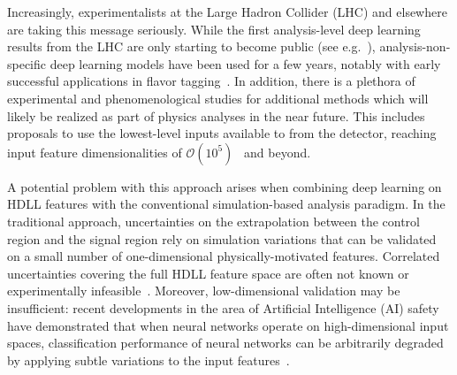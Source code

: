 \documentclass[reprint,nofootinbib,...]{revtex4-1}
\begin{document}

Increasingly, experimentalists at the Large Hadron Collider (LHC) and elsewhere are taking this message seriously.
While the first analysis-level deep learning results from the LHC are only starting to become public (see e.g.~\cite{Aad:2019yxi,ATLAS-CONF-2019-017,CMS-PAS-SUS-19-009}), analysis-non-specific deep learning models have been used for a few years, notably with early successful applications in flavor tagging~\cite{CMS-DP-2017-005,ATL-PHYS-PUB-2017-003}.
In addition, there is a plethora of experimental and phenomenological studies for additional methods which will likely be realized as part of physics analyses in the near future.
This includes proposals to use the lowest-level inputs available to from the detector, reaching input feature dimensionalities of $\mathcal{O}(10^5)$~\cite{Andrews:2018nwy,Andrews:2019faz} and beyond.



A potential problem with this approach arises when combining deep learning on HDLL features with the conventional simulation-based analysis paradigm.  In the traditional approach, uncertainties on the extrapolation between the control region and the signal region rely on simulation variations that can be validated on a small number of one-dimensional physically-motivated features.  Correlated uncertainties covering the full HDLL feature space are often not known or experimentally infeasible~\cite{Nachman:2019dol}.
Moreover, low-dimensional validation may be insufficient: recent developments in the area of Artificial Intelligence (AI) safety have demonstrated that when neural networks operate on high-dimensional input spaces, classification performance of neural networks can be arbitrarily degraded by applying subtle variations to the input features~\cite{Szegedy14intriguingproperties,DBLP:journals/corr/GoodfellowSS14}.
\end{document}

